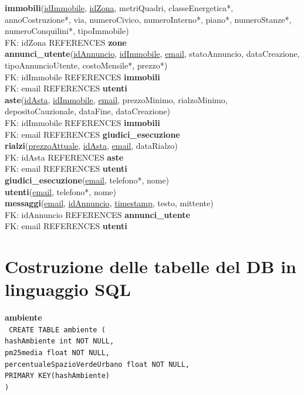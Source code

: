 \documentclass[a4paper,12pt]{report}
\begin{document}
        \textbf{immobili}(\underline{idImmobile}, \underline{idZona}, metriQuadri, classeEnergetica*, annoCostruzione*, via, numeroCivico, numeroInterno*, piano*, numeroStanze*, numeroConquilini*, tipoImmobile) \\
            \null\quad\quad FK: idZona REFERENCES \textbf{zone} \\
        \textbf{annunci\_utente}(\underline{idAnnuncio}, \underline{idImmobile}, \underline{email}, statoAnnuncio, dataCreazione, tipoAnnuncioUtente, costoMensile*, prezzo*) \\
            \null\quad\quad FK: idImmobile REFERENCES \textbf{immobili} \\
            \null\quad\quad FK: email REFERENCES \textbf{utenti} \\
        \textbf{aste}(\underline{idAsta}, \underline{idImmobile}, \underline{email}, prezzoMinimo, rialzoMinimo, depositoCauzionale, dataFine, dataCreazione) \\
            \null\quad\quad FK: idImmobile REFERENCES \textbf{immobili} \\
            \null\quad\quad FK: email REFERENCES \textbf{giudici\_esecuzione} \\
        \textbf{rialzi}(\underline{prezzoAttuale}, \underline{idAsta}, \underline{email}, dataRialzo) \\
            \null\quad\quad FK: idAsta REFERENCES \textbf{aste} \\
            \null\quad\quad FK: email REFERENCES \textbf{utenti} \\
        \textbf{giudici\_esecuzione}(\underline{email}, telefono*, nome) \\
        \textbf{utenti}(\underline{email}, telefono*, nome) \\
        \textbf{messaggi}(\underline{email}, \underline{idAnnuncio}, \underline{timestamp}, testo, mittente) \\
            \null\quad\quad FK: idAnnuncio REFERENCES \textbf{annunci\_utente} \\
            \null\quad\quad FK: email REFERENCES \textbf{utenti} \\
        	

            \section{Costruzione delle tabelle del DB in linguaggio SQL}
                
                \noindent
                {\large \textbf{ambiente}} \\
                \texttt{
                    CREATE TABLE ambiente ( \\
                    \null\quad\quad hashAmbiente int NOT NULL, \\
                    \null\quad\quad pm25media                      float           NOT NULL, \\
                    \null\quad\quad percentualeSpazioVerdeUrbano    float           NOT NULL, \\
                    \null\quad\quad PRIMARY KEY(hashAmbiente) \\
                    )
                } \\
\end{document}
